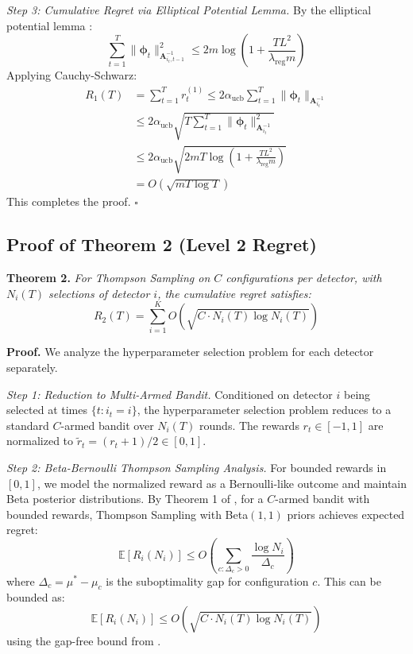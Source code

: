 \documentclass[11pt]{article}
\begin{document}
\textit{Step 3: Cumulative Regret via Elliptical Potential Lemma.}
By the elliptical potential lemma \cite{Dani2008Stochastic}:
\begin{equation}
\sum_{t=1}^T \|\boldsymbol{\phi}_t\|_{\mathbf{A}_{i_t,t-1}^{-1}}^2 \leq 2m\log\left(1 + \frac{TL^2}{\lambda_{\text{reg}} m}\right)
\end{equation}
Applying Cauchy-Schwarz:
\begin{align}
R_1(T) &= \sum_{t=1}^T r_t^{(1)} \leq 2\alpha_{\text{ucb}} \sum_{t=1}^T \|\boldsymbol{\phi}_t\|_{\mathbf{A}_{i_t}^{-1}} \\
&\leq 2\alpha_{\text{ucb}} \sqrt{T \sum_{t=1}^T \|\boldsymbol{\phi}_t\|_{\mathbf{A}_{i_t}^{-1}}^2} \\
&\leq 2\alpha_{\text{ucb}} \sqrt{2mT\log\left(1 + \frac{TL^2}{\lambda_{\text{reg}} m}\right)} \\
&= O(\sqrt{mT \log T})
\end{align}
This completes the proof. \hfill $\square$

\subsection{Proof of Theorem 2 (Level 2 Regret)}

\textbf{Theorem 2.} \textit{For Thompson Sampling on $C$ configurations per detector, with $N_i(T)$ selections of detector $i$, the cumulative regret satisfies:}
\begin{equation}
R_2(T) = \sum_{i=1}^{K} O(\sqrt{C \cdot N_i(T) \log N_i(T)})
\end{equation}

\textbf{Proof.} We analyze the hyperparameter selection problem for each detector separately.

\textit{Step 1: Reduction to Multi-Armed Bandit.}
Conditioned on detector $i$ being selected at times $\{t : i_t = i\}$, the hyperparameter selection problem reduces to a standard $C$-armed bandit over $N_i(T)$ rounds. The rewards $r_t \in [-1, 1]$ are normalized to $\tilde{r}_t = (r_t + 1)/2 \in [0, 1]$.

\textit{Step 2: Beta-Bernoulli Thompson Sampling Analysis.}
For bounded rewards in $[0,1]$, we model the normalized reward as a Bernoulli-like outcome and maintain Beta posterior distributions. By Theorem 1 of \cite{Agrawal2013Further}, for a $C$-armed bandit with bounded rewards, Thompson Sampling with Beta$(1,1)$ priors achieves expected regret:
\begin{equation}
\mathbb{E}[R_i(N_i)] \leq O\left(\sum_{c: \Delta_c > 0} \frac{\log N_i}{\Delta_c}\right)
\end{equation}
where $\Delta_c = \mu^* - \mu_c$ is the suboptimality gap for configuration $c$. This can be bounded as:
\begin{equation}
\mathbb{E}[R_i(N_i)] \leq O(\sqrt{C \cdot N_i(T) \log N_i(T)})
\end{equation}
using the gap-free bound from \cite{Agrawal2012Thompson}.
\end{document}
